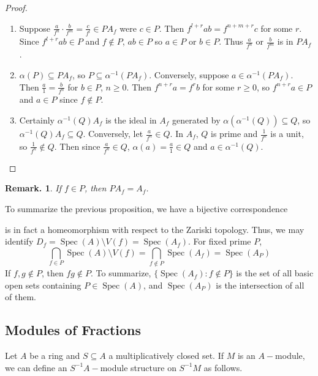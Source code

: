 \documentclass[11pt, a4paper]{memoir}
\theoremstyle{change}
\theoremstyle{plain}
\theoremstyle{nonumberplain}
\newtheorem{remark}{Remark.}
\newtheorem{proof}{Proof}
\DeclareMathOperator{\Spec}{Spec}
\numberwithin{equation}{section}
\begin{document}
\begin{proof}
    \begin{enumerate}
        \item Suppose $\frac{a}{f^n}\cdot\frac{b}{f^m}=\frac{c}{f^l}\in PA_f$ were $c\in P$.
            Then $f^{l+r}ab=f^{n+m+r}c$ for some $r$.
            Since $f^{l+r}ab\in P$ and $f\notin P$, $ab\in P$ so $a\in P$ or $b\in P$.
            Thus $\frac{a}{f^n}$ or $\frac{b}{f^m}$ is in $PA_f$.
        \item 
            $\alpha(P)\subseteq PA_f$, so $P\subseteq\alpha^{-1}(PA_f)$.
            Conversely, suppose $a\in\alpha^{-1}(PA_f)$.
            Then $\frac{a}{1}=\frac{b}{f^n}$ for $b\in P$, $n\geq 0$.
            Then $f^{n+r}a=f^rb$ for some $r\geq 0$, so $f^{n+r}a\in P$ and $a\in P$ since $f\notin P$.
        \item Certainly $\alpha^{-1}(Q)A_f$ is the ideal in $A_f$ generated by $\alpha(\alpha^{-1}(Q))\subseteq Q$, so $\alpha^{-1}(Q)A_f\subseteq Q$.
            Conversely, let $\frac{a}{f^n}\in Q$.
            In $A_f$, $Q$ is prime and $\frac{1}{f^n}$ is a unit, so $\frac{1}{f^n}\notin Q$.
            Then since $\frac{a}{f^n}\in Q$, $\alpha(a)=\frac{a}{1}\in Q$ and $a\in\alpha^{-1}(Q)$.
    \end{enumerate}
\end{proof}
\begin{remark}
    If $f\in P$, then $PA_f=A_f$.
\end{remark}
To summarize the previous proposition, we have a bijective correspondence
\begin{center}
\end{center}
is in fact a homeomorphism with respect to the Zariski topology.
Thus, we may identify $D_f=\Spec(A)\setminus V(f)=\Spec(A_f)$.
For fixed prime $P$,
\begin{equation*}
    \bigcap_{f\in P}\Spec(A)\setminus V(f)=\bigcap_{f\notin P}\Spec(A_f)=\Spec(A_P)
\end{equation*}
If $f,g\notin P$, then $fg\notin P$.
To summarize, $\{\Spec(A_f):f\notin P\}$ is the set of all basic open sets containing $P\in\Spec(A)$, and $\Spec(A_P)$ is the intersection of all of them.
\subsection{Modules of Fractions}
Let $A$ be a ring and $S\subseteq A$ a multiplicatively closed set.
If $M$ is an $A-$module, we can define an $S^{-1}A-$module structure on $S^{-1}M$ as follows.
\end{document}
